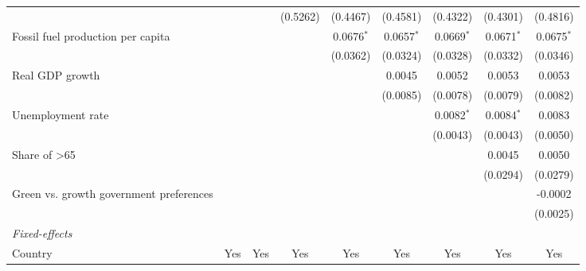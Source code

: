 \begin{table}[htbp]
\begin{tabular}{lcccccccc}
                                                                &                 &          & (0.5262) & (0.4467)     & (0.4581)     & (0.4322)     & (0.4301)     & (0.4816)\\   
      Fossil fuel production per capita                         &                 &          &          & 0.0676$^{*}$ & 0.0657$^{*}$ & 0.0669$^{*}$ & 0.0671$^{*}$ & 0.0675$^{*}$\\   
                                                                &                 &          &          & (0.0362)     & (0.0324)     & (0.0328)     & (0.0332)     & (0.0346)\\   
      Real GDP growth                                           &                 &          &          &              & 0.0045       & 0.0052       & 0.0053       & 0.0053\\   
                                                                &                 &          &          &              & (0.0085)     & (0.0078)     & (0.0079)     & (0.0082)\\   
      Unemployment rate                                         &                 &          &          &              &              & 0.0082$^{*}$ & 0.0084$^{*}$ & 0.0083\\   
                                                                &                 &          &          &              &              & (0.0043)     & (0.0043)     & (0.0050)\\   
      Share of >65                                              &                 &          &          &              &              &              & 0.0045       & 0.0050\\   
                                                                &                 &          &          &              &              &              & (0.0294)     & (0.0279)\\   
      Green vs. growth government preferences                   &                 &          &          &              &              &              &              & -0.0002\\   
                                                                &                 &          &          &              &              &              &              & (0.0025)\\   
      \midrule
      \emph{Fixed-effects}\\
      Country                                                   & Yes             & Yes      & Yes      & Yes          & Yes          & Yes          & Yes          & Yes\\  

\end{tabular}
\end{table}

